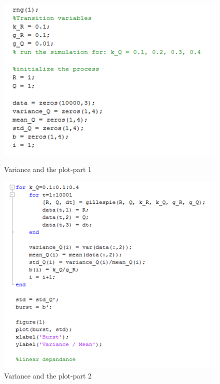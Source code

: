 \documentclass[a4paper]{article}
\begin{document}
\begin{figure}[ht]
\centering
\begin{minipage}[b]{0.51\textwidth}
\includegraphics[width=\textwidth]{code_part3_q2.PNG}
\caption{Variance and the plot-part 1}
\label{fig:variance part1}
\end{minipage}
\quad
\begin{minipage}[b]{0.39\textwidth}
\includegraphics[width=\textwidth]{code_part4_q2.PNG}
\caption{Variance and the plot-part 2}
\label{fig:variance part2}
\end{minipage}
\end{figure}
\end{document}
